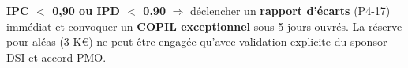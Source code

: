 \documentclass[11pt,a4paper,oneside]{report}
\begin{document}
\begin{reco}
\textbf{IPC $<$ 0{,}90 ou IPD $<$ 0{,}90} $\Rightarrow$ déclencher un \textbf{rapport d'écarts} (P4-17) immédiat et convoquer un \textbf{COPIL exceptionnel} sous 5 jours ouvrés. La réserve pour aléas (3 K€) ne peut être engagée qu'avec validation explicite du sponsor DSI et accord PMO.
\end{reco}
\end{document}

